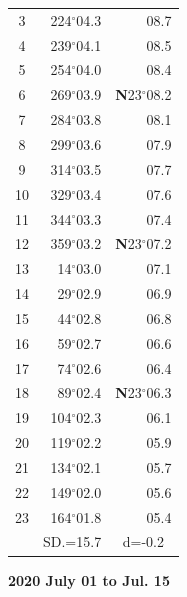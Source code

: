 \documentclass[10pt, a4paper]{report}
\begin{document}
\begin{scriptsize}
\begin{tabular*}{0.2\textwidth}[t]{@{\extracolsep{\fill}}|c|rr|}
3 & 224$^\circ$04.3 & \raisebox{0.24ex}{\boldmath$\cdot$~\boldmath$\cdot$~~}08.7\\
4 & 239$^\circ$04.1 & 08.5\\
5 & 254$^\circ$04.0 & 08.4\\[2Pt]
6 & 269$^\circ$03.9 & \textbf{N}23$^\circ$08.2\\
7 & 284$^\circ$03.8 & 08.1\\
8 & 299$^\circ$03.6 & 07.9\\
9 & 314$^\circ$03.5 & \raisebox{0.24ex}{\boldmath$\cdot$~\boldmath$\cdot$~~}07.7\\
10 & 329$^\circ$03.4 & 07.6\\
11 & 344$^\circ$03.3 & 07.4\\[2Pt]
12 & 359$^\circ$03.2 & \textbf{N}23$^\circ$07.2\\
13 & 14$^\circ$03.0 & 07.1\\
14 & 29$^\circ$02.9 & 06.9\\
15 & 44$^\circ$02.8 & \raisebox{0.24ex}{\boldmath$\cdot$~\boldmath$\cdot$~~}06.8\\
16 & 59$^\circ$02.7 & 06.6\\
17 & 74$^\circ$02.6 & 06.4\\[2Pt]
18 & 89$^\circ$02.4 & \textbf{N}23$^\circ$06.3\\
19 & 104$^\circ$02.3 & 06.1\\
20 & 119$^\circ$02.2 & 05.9\\
21 & 134$^\circ$02.1 & \raisebox{0.24ex}{\boldmath$\cdot$~\boldmath$\cdot$~~}05.7\\
22 & 149$^\circ$02.0 & 05.6\\
23 & 164$^\circ$01.8 & 05.4\\
\hline
\rule{0pt}{2.4ex} & \multicolumn{1}{c}{SD.=15.7} & \multicolumn{1}{c|}{d=-0.2}\\
\hline
\end{tabular*}

\end{scriptsize}
\newpage
\sffamily
\noindent
\begin{flushright}
\textbf{2020 July 01 to Jul. 15}\par
\end{flushright}
\end{document}
